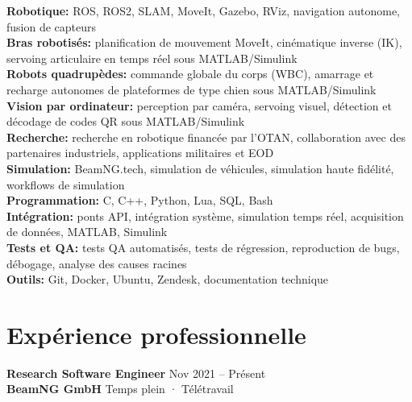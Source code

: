 \documentclass[11pt,a4paper]{article}
\begin{document}
{\small
\textbf{Robotique:} ROS, ROS2, SLAM, MoveIt, Gazebo, RViz, navigation autonome, fusion de capteurs\\
\textbf{Bras robotisés:} planification de mouvement MoveIt, cinématique inverse (IK), servoing articulaire en temps réel sous MATLAB/Simulink\\
\textbf{Robots quadrupèdes:} commande globale du corps (WBC), amarrage et recharge autonomes de plateformes de type chien sous MATLAB/Simulink\\
\textbf{Vision par ordinateur:} perception par caméra, servoing visuel, détection et décodage de codes QR sous MATLAB/Simulink\\
\textbf{Recherche:} recherche en robotique financée par l'OTAN, collaboration avec des partenaires industriels, applications militaires et EOD\\
\textbf{Simulation:} BeamNG.tech, simulation de véhicules, simulation haute fidélité, workflows de simulation\\
\textbf{Programmation:} C, C++, Python, Lua, SQL, Bash\\
\textbf{Intégration:} ponts API, intégration système, simulation temps réel, acquisition de données, MATLAB, Simulink\\
\textbf{Tests et QA:} tests QA automatisés, tests de régression, reproduction de bugs, débogage, analyse des causes racines\\
\textbf{Outils:} Git, Docker, Ubuntu, Zendesk, documentation technique
}

\section*{Expérience professionnelle}

\textbf{Research Software Engineer} \hfill Nov 2021 -- Présent\\
\textbf{BeamNG GmbH} \hfill Temps plein · Télétravail
\end{document}
